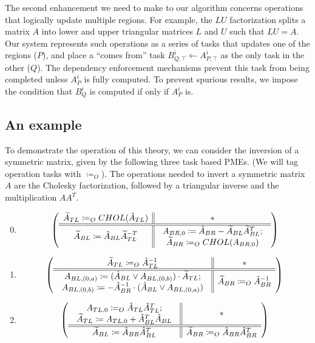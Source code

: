 \documentclass[12pt,letterpaper]{article}
\begin{document}
The second enhancement we need to make to our algorithm concerns operations that logically update multiple regions.
For example, the $LU$ factorization splits a matrix $A$ into lower and upper triangular matrices $L$ and $U$ such that $LU = A$.
Our system represents such operations as a series of tasks that updates one of the regions ($P$), and place a ``comes from'' task $B^i_{Q, \top} \leftarrow A^i_{P, \top}$ as the only task in the other ($Q$).
The dependency enforcement mechanisms prevent this task from being completed unless $A^i_P$ is fully computed.
To prevent spurious results, we impose the condition that $B^i_Q$ is computed if only if $A^i_P$ is.

\subsection{An example}
To demonstrate the operation of this theory, we can consider the inversion of a symmetric matrix, given by the following three task based PMEs. (We will tag operation tasks with $\coloneqq_O$).
The operations needed to invert a symmetric matrix $A$ are the Cholesky factorization, followed by a triangular inverse and the multiplication $AA^{T}$.

\begin{enumerate}
\setcounter{enumi}{-1} %
\item
  \begin{equation*}
  \left( \begin{array}{c || c} \widetilde{A}_{TL} \coloneqq_O CHOL(\hat{A}_{TL}) & * \\ \hline \hline \widetilde{A}_{BL} \coloneqq \hat{A}_{BL}\widetilde{A}_{TL}^{-T} & \begin{array}{c}
     A_{BR, 0} \coloneqq \hat{A}_{BR} - \widetilde{A}_{BL}\widetilde{A}_{BL}^T;\\
     \widetilde{A}_{BR} \coloneqq_O CHOL(A_{BR, 0})
   \end{array} \end{array} \right)
  \end{equation*}
\item
  \begin{equation*}
    \left( \begin{array}{c || c} \widetilde{A}_{TL} \coloneqq_O \hat{A}_{TL}^{-1} & * \\ \hline \hline \begin{array}{c}
       A_{BL, (0, a)} \coloneqq (\hat{A}_{BL} \vee A_{BL, (0, b)}) \cdot \widetilde{A}_{TL};\\
       A_{BL, (0, b)} \coloneqq -\hat{A}_{BR}^{-1} \cdot (\hat{A}_{BL} \vee A_{BL, (0, a)})
     \end{array} & \widetilde{A}_{BR} \coloneqq_O \hat{A}_{BR}^{-1} \end{array} \right)
  \end{equation*}
\item
  \begin{equation*}
    \left( \begin{array}{c || c} \begin{array}{c}
                   A_{TL, 0} \coloneqq_O \hat{A}_{TL}\hat{A}_{TL}^T;\\
                   \widetilde{A}_{TL} \coloneqq A_{TL, 0} + \hat{A}_{BL}^T\hat{A}_{BL}
                 \end{array} & * \\ \hline \hline \widetilde{A}_{BL} \coloneqq \hat{A}_{BR}\hat{A}_{BL}^T & \widetilde{A}_{BR} \coloneqq_O \hat{A}_{BR}\hat{A}_{BR}^T \end{array} \right)
  \end{equation*}
\end{enumerate}
\end{document}
